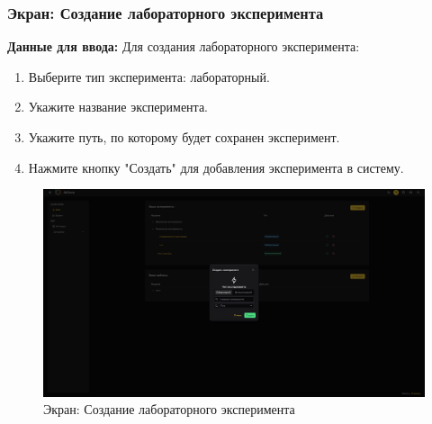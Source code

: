 \documentclass[a4paper,12pt,reqno]{article}
\begin{document}
\subsubsection{Экран: Создание лабораторного эксперимента}
\textbf{Данные для ввода:}  
Для создания лабораторного эксперимента:
\begin{enumerate}
    \item Выберите тип эксперимента: лабораторный.
    \item Укажите название эксперимента.
    \item Укажите путь, по которому будет сохранен эксперимент.
    \item Нажмите кнопку "Создать" для добавления эксперимента в систему.
\end{enumerate}
\begin{figure}[H]
    \centering
    \includegraphics[width=\textwidth]{RO/img/create_lab.png} %
    \caption{Экран: Создание лабораторного эксперимента}
    \label{fig:create_lab}
\end{figure}
\end{document}
